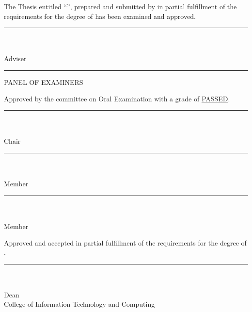 \begingroup
\setlength{\parindent}{1.25cm}\linespread{1.35}\selectfont
The Thesis entitled ``\textbf{\citcTitleInline}'', prepared and submitted by
\textbf{\citcAuthorsInline} in partial fulfillment of the requirements for the
degree of \textbf{\citcDegree} has been examined and approved.
\par
\endgroup

\vspace{2\baselineskip}
\begin{center}
\rule{7.5cm}{0.4pt}\\
\textbf{\citcAdviser}\\
Adviser
\end{center}

\vspace{1\baselineskip}
\begin{center}\rule{\linewidth}{1.2pt}\end{center}
\begin{center}PANEL OF EXAMINERS\end{center}
\vspace{0.5\baselineskip}
\noindent Approved by the committee on Oral Examination with a grade of
\underline{PASSED}.

\vspace{1.5\baselineskip}
\begin{center}
\rule{7.5cm}{0.4pt}\\
\textbf{\citcChair}\\
Chair
\end{center}

\vspace{1\baselineskip}
\noindent\begin{minipage}[t]{0.48\linewidth}\centering
\rule{6cm}{0.4pt}\\
\textbf{\citcMemberA}\\
Member
\end{minipage}\hfill
\begin{minipage}[t]{0.48\linewidth}\centering
\rule{6cm}{0.4pt}\\
\textbf{\citcMemberB}\\
Member
\end{minipage}

\vspace{1.5\baselineskip}
\noindent Approved and accepted in partial fulfillment of the requirements for
the degree of \citcDegree.

\vspace{1.5\baselineskip}
\begin{center}
\rule{7.5cm}{0.4pt}\\
\textbf{\citcDean}\\
Dean\\
College of Information Technology and Computing
\end{center}

